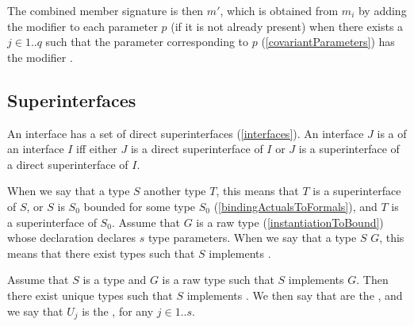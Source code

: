\documentclass[makeidx]{article}
\begin{document}
\LMHash{}%
The combined member signature is then $m'$,
which is obtained from $m_i$ by adding the modifier \COVARIANT{}
to each parameter $p$ (if it is not already present)
when there exists a $j \in 1 .. q$
such that the parameter corresponding to $p$
(\ref{covariantParameters})
has the modifier \COVARIANT.
\EndCase


\subsection{Superinterfaces}

\LMHash{}%
An interface has a set of direct superinterfaces
(\ref{interfaces}).
An interface $J$ is a  of an interface $I$
if{}f either $J$ is a direct superinterface of $I$
or $J$ is a superinterface of a direct superinterface of $I$.

\LMHash{}%
When we say that a type $S$
another type $T$,
this means that $T$ is a superinterface of $S$,
or $S$ is $S_0$ bounded for some type $S_0$
(\ref{bindingActualsToFormals}),
and $T$ is a superinterface of $S_0$.
Assume that $G$ is a raw type
(\ref{instantiationToBound})
whose declaration declares $s$ type parameters.
When we say that a type $S$
$G$,
this means that there exist types 
such that $S$ implements .


\LMHash{}%
Assume that $S$ is a type and $G$ is a raw type such that $S$ implements $G$.
Then there exist unique types  such that
$S$ implements .
We then say that  are the
,
and we say that $U_j$ is the
,
for any $j \in 1 .. s$.
\end{document}
